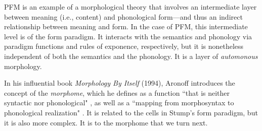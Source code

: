 %

PFM is an example of a morphological theory that involves an intermediate layer between
meaning (i.e., content) and phonological form---and thus an indirect relationship between
meaning and form. In the case of PFM, this intermediate
level is of the form paradigm. It interacts with the semantics and phonology 
via paradigm functions and rules of exponence, respectively,
but it is nonetheless independent of both the semantics and the phonology.
It is a layer of \emph{automonous} morphology. 

In his influential book \textit{Morphology By Itself} (1994), Aronoff 
introduces the concept of the \emph{morphome}, which he
defines as a function ``that is neither 
syntactic nor phonological" \cite[][p. 25]{aronoff:1994}, %
as well as a %
``mapping from morphosyntax to phonological realization" \citep[][p. 25]{aronoff:1994}. It is related
to the cells in Stump's form paradigm, but it is also more complex. It is to the morphome that we turn next.



